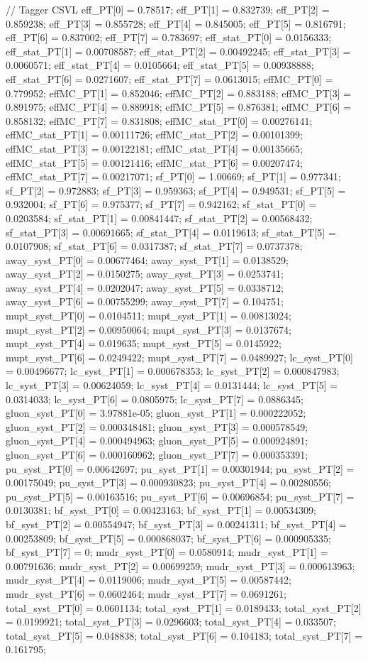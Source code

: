 // Tagger CSVL
eff_PT[0] = 0.78517; eff_PT[1] = 0.832739; eff_PT[2] = 0.859238; 
eff_PT[3] = 0.855728; eff_PT[4] = 0.845005; eff_PT[5] = 0.816791; 
eff_PT[6] = 0.837002; eff_PT[7] = 0.783697; 
eff_stat_PT[0] = 0.0156333; eff_stat_PT[1] = 0.00708587; eff_stat_PT[2] = 0.00492245; 
eff_stat_PT[3] = 0.0060571; eff_stat_PT[4] = 0.0105664; eff_stat_PT[5] = 0.00938888; 
eff_stat_PT[6] = 0.0271607; eff_stat_PT[7] = 0.0613015; 
effMC_PT[0] = 0.779952; effMC_PT[1] = 0.852046; effMC_PT[2] = 0.883188; 
effMC_PT[3] = 0.891975; effMC_PT[4] = 0.889918; effMC_PT[5] = 0.876381; 
effMC_PT[6] = 0.858132; effMC_PT[7] = 0.831808; 
effMC_stat_PT[0] = 0.00276141; effMC_stat_PT[1] = 0.00111726; effMC_stat_PT[2] = 0.00101399; 
effMC_stat_PT[3] = 0.00122181; effMC_stat_PT[4] = 0.00135665; effMC_stat_PT[5] = 0.00121416; 
effMC_stat_PT[6] = 0.00207474; effMC_stat_PT[7] = 0.00217071; 
sf_PT[0] = 1.00669; sf_PT[1] = 0.977341; sf_PT[2] = 0.972883; 
sf_PT[3] = 0.959363; sf_PT[4] = 0.949531; sf_PT[5] = 0.932004; 
sf_PT[6] = 0.975377; sf_PT[7] = 0.942162; 
sf_stat_PT[0] = 0.0203584; sf_stat_PT[1] = 0.00841447; sf_stat_PT[2] = 0.00568432; 
sf_stat_PT[3] = 0.00691665; sf_stat_PT[4] = 0.0119613; sf_stat_PT[5] = 0.0107908; 
sf_stat_PT[6] = 0.0317387; sf_stat_PT[7] = 0.0737378; 
away_syst_PT[0] = 0.00677464; away_syst_PT[1] = 0.0138529; away_syst_PT[2] = 0.0150275; 
away_syst_PT[3] = 0.0253741; away_syst_PT[4] = 0.0202047; away_syst_PT[5] = 0.0338712; 
away_syst_PT[6] = 0.00755299; away_syst_PT[7] = 0.104751; 
mupt_syst_PT[0] = 0.0104511; mupt_syst_PT[1] = 0.00813024; mupt_syst_PT[2] = 0.00950064; 
mupt_syst_PT[3] = 0.0137674; mupt_syst_PT[4] = 0.019635; mupt_syst_PT[5] = 0.0145922; 
mupt_syst_PT[6] = 0.0249422; mupt_syst_PT[7] = 0.0489927; 
lc_syst_PT[0] = 0.00496677; lc_syst_PT[1] = 0.000678353; lc_syst_PT[2] = 0.000847983; 
lc_syst_PT[3] = 0.00624059; lc_syst_PT[4] = 0.0131444; lc_syst_PT[5] = 0.0314033; 
lc_syst_PT[6] = 0.0805975; lc_syst_PT[7] = 0.0886345; 
gluon_syst_PT[0] = 3.97881e-05; gluon_syst_PT[1] = 0.000222052; gluon_syst_PT[2] = 0.000348481; 
gluon_syst_PT[3] = 0.000578549; gluon_syst_PT[4] = 0.000494963; gluon_syst_PT[5] = 0.000924891; 
gluon_syst_PT[6] = 0.000160962; gluon_syst_PT[7] = 0.000353391; 
pu_syst_PT[0] = 0.00642697; pu_syst_PT[1] = 0.00301944; pu_syst_PT[2] = 0.00175049; 
pu_syst_PT[3] = 0.000930823; pu_syst_PT[4] = 0.00280556; pu_syst_PT[5] = 0.00163516; 
pu_syst_PT[6] = 0.00696854; pu_syst_PT[7] = 0.0130381; 
bf_syst_PT[0] = 0.00423163; bf_syst_PT[1] = 0.00534309; bf_syst_PT[2] = 0.00554947; 
bf_syst_PT[3] = 0.00241311; bf_syst_PT[4] = 0.00253809; bf_syst_PT[5] = 0.000868037; 
bf_syst_PT[6] = 0.000905335; bf_syst_PT[7] = 0; 
mudr_syst_PT[0] = 0.0580914; mudr_syst_PT[1] = 0.00791636; mudr_syst_PT[2] = 0.00699259; 
mudr_syst_PT[3] = 0.000613963; mudr_syst_PT[4] = 0.0119006; mudr_syst_PT[5] = 0.00587442; 
mudr_syst_PT[6] = 0.0602464; mudr_syst_PT[7] = 0.0691261; 
total_syst_PT[0] = 0.0601134; total_syst_PT[1] = 0.0189433; total_syst_PT[2] = 0.0199921; 
total_syst_PT[3] = 0.0296603; total_syst_PT[4] = 0.033507; total_syst_PT[5] = 0.048838; 
total_syst_PT[6] = 0.104183; total_syst_PT[7] = 0.161795; 



